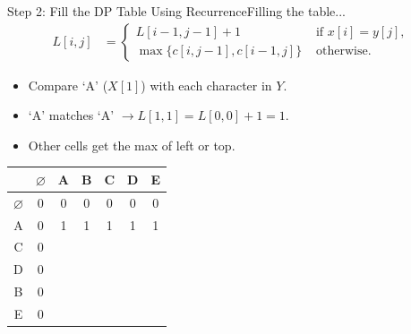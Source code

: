 \documentclass[aspectratio=169]{beamer}
\begin{document}
\begin{frame}{Step 2: Fill the DP Table Using Recurrence}{Filling the table...}
    \vspace{-10mm}
    \scriptsize
    \begin{equation*}
        \begin{align*}
            L[i, j] &=
                        \begin{cases}
                            L[i - 1, j - 1] + 1 & \text{ if } x[i] = y[j] \text{, } \\
                            \max \{ c[i, j - 1], c[i - 1, j] \} & \text{ otherwise.}
                        \end{cases}
        \end{align*}
    \end{equation*}
    \begin{itemize}
        \item Compare `A' ($X[1]$) with each character in $Y$.
        \item `A' matches `A' $\longrightarrow L[1,1] = L[0,0] + 1 = 1$.
        \item Other cells get the max of left or top.
    \end{itemize}
    \vspace{6mm}
    \normalsize
    \centering
    \begin{tabular}{|c|c|c|c|c|c|c|} \hline
                      & $\varnothing$ & A & B & C & D & E \\ \hline
        $\varnothing$ &        0      & 0 & 0 & 0 & 0 & 0 \\ \hline
               A      &        0      & 1 & 1 & 1 & 1 & 1 \\ \hline
               C      &        0      &   &   &   &   &   \\ \hline
               D      &        0      &   &   &   &   &   \\ \hline
               B      &        0      &   &   &   &   &   \\ \hline
               E      &        0      &   &   &   &   &   \\ \hline
    \end{tabular}
\end{frame}
\end{document}
